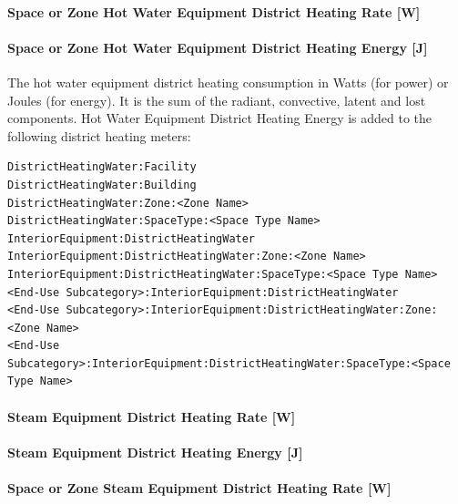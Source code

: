 \paragraph{Space or Zone Hot Water Equipment District Heating Rate {[}W{]}}\label{zone-hot-water-equipment-district-heating-rate-w}

\paragraph{Space or Zone Hot Water Equipment District Heating Energy {[}J{]}}\label{zone-hot-water-equipment-district-heating-energy-j}

The hot water equipment district heating consumption in Watts (for power) or Joules (for energy). It is the sum of the radiant, convective, latent and lost components. Hot Water Equipment District Heating Energy is added to the following district heating meters:

\begin{lstlisting}
DistrictHeatingWater:Facility
DistrictHeatingWater:Building
DistrictHeatingWater:Zone:<Zone Name>
DistrictHeatingWater:SpaceType:<Space Type Name>
InteriorEquipment:DistrictHeatingWater
InteriorEquipment:DistrictHeatingWater:Zone:<Zone Name>
InteriorEquipment:DistrictHeatingWater:SpaceType:<Space Type Name>
<End-Use Subcategory>:InteriorEquipment:DistrictHeatingWater
<End-Use Subcategory>:InteriorEquipment:DistrictHeatingWater:Zone:<Zone Name>
<End-Use Subcategory>:InteriorEquipment:DistrictHeatingWater:SpaceType:<Space Type Name>
\end{lstlisting}

\paragraph{Steam Equipment District Heating Rate {[}W{]}}\label{steam-equipment-district-heating-rate-w}

\paragraph{Steam Equipment District Heating Energy {[}J{]}}\label{steam-equipment-district-heating-energy-j}

\paragraph{Space or Zone Steam Equipment District Heating Rate {[}W{]}}\label{zone-steam-equipment-district-heating-rate-w}

